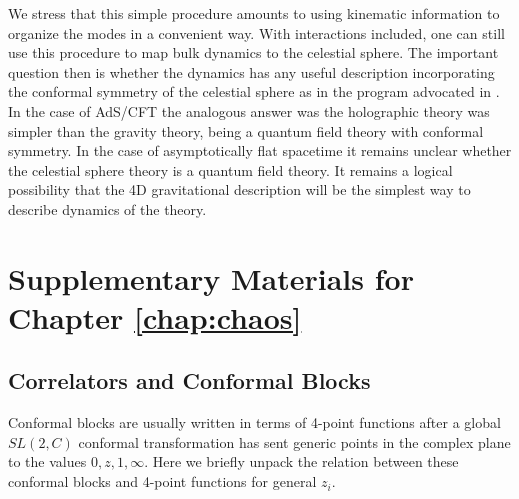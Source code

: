 \documentclass{brownthesis}
\begin{document}
We stress that this simple procedure amounts to using kinematic information
to organize the modes in a convenient way. With interactions included,
one can still use this procedure to map bulk dynamics to the celestial
sphere. The important question then is whether the dynamics has any
useful description incorporating the conformal symmetry of the celestial
sphere as in the program advocated in \cite{Pasterski:2016qvg}. In
the case of AdS/CFT the analogous answer was the holographic theory
was simpler than the gravity theory, being a quantum field theory
with conformal symmetry. In the case of asymptotically flat spacetime
it remains unclear whether the celestial sphere theory is a quantum
field theory. It remains a logical possibility that the 4D gravitational
description will be the simplest way to describe dynamics of the theory.

\appendix

\chapter{Supplementary Materials for Chapter \ref{chap:chaos}}

\section{\label{sec:Correlators-and-Conformal}Correlators and Conformal Blocks}

Conformal blocks are usually written in terms of 4-point functions
after a global $SL(2,C)$ conformal transformation has sent generic
points in the complex plane to the values $0,z,1,\infty$. Here we
briefly unpack the relation between these conformal blocks and 4-point
functions for general $z_{i}$.
\end{document}
